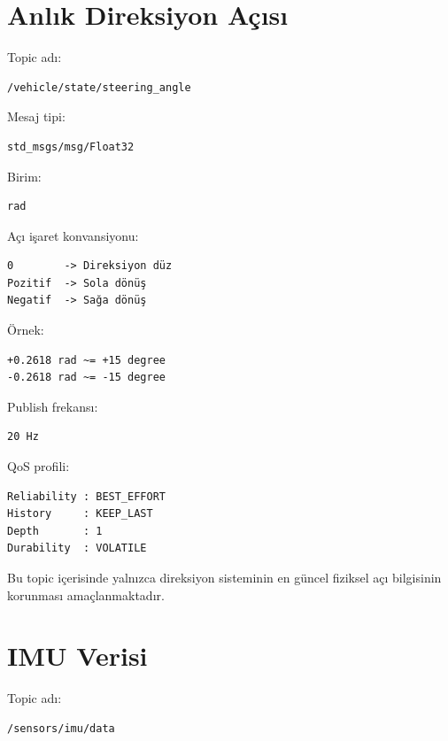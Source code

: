 \documentclass[12pt,a4paper]{article}
\begin{document}
\section{Anlık Direksiyon Açısı}

Topic adı:

\begin{verbatim}
/vehicle/state/steering_angle
\end{verbatim}

Mesaj tipi:

\begin{verbatim}
std_msgs/msg/Float32
\end{verbatim}

Birim:

\begin{verbatim}
rad
\end{verbatim}

Açı işaret konvansiyonu:

\begin{verbatim}
0        -> Direksiyon düz
Pozitif  -> Sola dönüş
Negatif  -> Sağa dönüş
\end{verbatim}

Örnek:

\begin{verbatim}
+0.2618 rad ~= +15 degree
-0.2618 rad ~= -15 degree
\end{verbatim}

Publish frekansı:

\begin{verbatim}
20 Hz
\end{verbatim}

QoS profili:

\begin{verbatim}
Reliability : BEST_EFFORT
History     : KEEP_LAST
Depth       : 1
Durability  : VOLATILE
\end{verbatim}

Bu topic içerisinde yalnızca direksiyon sisteminin en güncel fiziksel açı
bilgisinin korunması amaçlanmaktadır.

\section{IMU Verisi}

Topic adı:

\begin{verbatim}
/sensors/imu/data
\end{verbatim}
\end{document}
